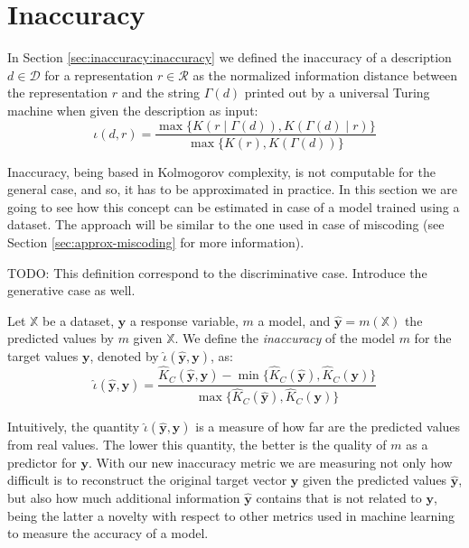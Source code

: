 %
%

\section{Inaccuracy}
\label{sec:machine_learning_inaccuracy}

In Section \ref{sec:inaccuracy:inaccuracy} we defined the inaccuracy of a description $d \in \mathcal{D}$ for a representation $r \in \mathcal{R}$ as the normalized information distance between the representation $r$ and the string $\Gamma(d)$ printed out by a universal Turing machine when given the description as input:
\[
\iota(d, r) = \frac{ \max\{ K \left(r \mid \Gamma(d) \right), K \left( \Gamma(d) \mid r \right) \} } { \max\{ K(r), K \left(\Gamma(d) \right) \} }
\]

Inaccuracy, being based in Kolmogorov complexity, is not computable for the general case, and so, it has to be approximated in practice. In this section we are going to see how this concept can be estimated in case of a model trained using a dataset. The approach will be similar to the one used in case of miscoding (see Section \ref{sec:approx-miscoding} for more information).




{\color{red} TODO: This definition correspond to the discriminative case. Introduce the generative case as well.}

\begin{definition}
Let $\mathbb{X}$ be a dataset, $\mathbf{y}$ a response variable, $m$ a model, and $\mathbf{\hat{y}} = m(\mathbb{X})$ the predicted values by $m$ given $\mathbb{X}$. We define the \emph{inaccuracy} of the model $m$ for the target values $\mathbf{y}$, denoted by $\hat\iota(\mathbf{\hat{y}}, \mathbf{y})$, as:
\[
\hat\iota(\mathbf{\hat{y}}, \mathbf{y}) = \frac{ \hat{K}_C(\mathbf{\hat{y}}, \mathbf{y}) - \min\{ \hat{K}_C(\mathbf{\hat{y}}), \hat{K}_C(\mathbf{y}) \} } { \max\{ \hat{K}_C(\mathbf{\hat{y}}), \hat{K}_C(\mathbf{y}) \} }
\]\end{definition}

Intuitively, the quantity $\hat\iota(\mathbf{\hat{y}}, \mathbf{y})$ is a measure of how far are the predicted values from real values. The lower this quantity, the better is the quality of $m$ as a predictor for $\mathbf{y}$. With our new inaccuracy metric we are measuring not only how difficult is to reconstruct the original target vector $\mathbf{y}$ given the predicted values $\mathbf{\hat{y}}$, but also how much additional information $\mathbf{\hat{y}}$ contains that is not related to $\mathbf{y}$, being the latter a novelty with respect to other metrics used in machine learning to measure the accuracy of a model.

